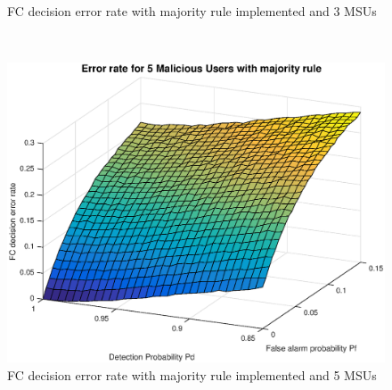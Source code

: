 \documentclass[letterpaper, 10 pt, conference]{ieeeconf}  %
\begin{document}
\begin{figure}[t]
\begin{minipage}[t]{0.32\textwidth}
        \caption{FC decision error rate with majority rule implemented and 3 MSUs}
        \label{mr3}
    \end{minipage}
    ~
    \begin{minipage}[t]{0.32\textwidth}
        \centering
        \includegraphics[width=\linewidth]{figures/mr5mu.eps}
        \caption{FC decision error rate with majority rule implemented and 5 MSUs}
        \label{mr5}
    \end{minipage}
    \end{figure}
\end{document}
